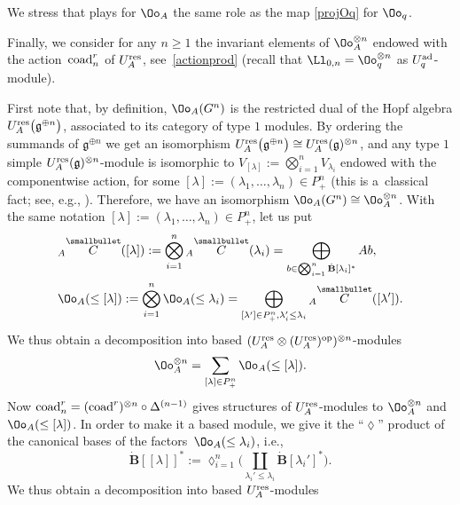 We stress that  plays for $\Oo_A$ the same role as the map \eqref{projOq} for $\Oo_q$.

Finally, we consider for any $n\geq 1$ the invariant elements of $\Oo_A^{\otimes n}$ endowed with the action~${\rm coad}^r_n$ of $U_A^{\rm res}$, see~\eqref{actionprod} \big(recall that $\Ll_{0,n}=\Oo_q^{\otimes n}$ as $U_q^{\rm ad}$-module\big).

First note that, by definition, $\Oo_A(G^n)$ is the restricted dual of the Hopf algebra $U_A^{\rm res}\big(\mathfrak{g}^{\oplus n}\big)$, associated to its category of type $1$ modules. By ordering the summands of $\mathfrak{g}^{\oplus n}$ we get an isomorphism $U_A^{\rm res}\big(\mathfrak{g}^{\oplus n}\big)\cong U_A^{\rm res}(\mathfrak{g})^{\otimes n}$, and any type $1$ simple $U_A^{\rm res}(\mathfrak{g})^{\otimes n}$-module is isomorphic to ${V_{[\lambda]} := \bigotimes_{i=1}^n V_{\lambda_i}}$ endowed with the componentwise action, for some ${[\lambda] :=(\lambda_1,\dots, \lambda_n)\in P_+^n}$ (this is a~classical fact; see, e.g., \cite[Theorem~3.10.2]{Et}). Therefore, we have an isomorphism ${\Oo_A(G^n)\cong \Oo_A^{\otimes n}}$.
With the same notation $[\lambda]:=(\lambda_1,\dots, \lambda_n)\in P_+^n$, let us put
\begin{align*}%
&{}_A \overset{\raisebox{-1.5pt}{\scriptsize$\smallbullet$}}{C} ([\lambda]) := \bigotimes_{i=1}^n {}_A \overset{\raisebox{-1.5pt}{\scriptsize$\smallbullet$}}{C} (\lambda_i) = \bigoplus_{b\in \bigotimes_{i=1}^n \dot{\mathbf{B}}[\lambda_i]^*} Ab,\\
&\Oo_A(\leq [\lambda]) := \bigotimes_{i=1}^n \Oo_A(\leq \lambda_i)=\bigoplus_{[\lambda'] \in P_+^n, \lambda_i'\leq \lambda_i} {}_A \overset{\raisebox{-1.5pt}{\scriptsize$\smallbullet$}}{C} ([\lambda']).
\end{align*}
We thus obtain a decomposition into based $(U_A^{\rm res}\otimes (U_A^{\rm res})^{\rm op})^{\otimes n}$-modules
\[%
\Oo_A^{\otimes n} = \sum_{[\lambda] \in P_+^n} \Oo_A(\leq [\lambda]).
\]
Now ${\rm coad}_n^r = ({\rm coad}^r)^{\otimes n}\circ \Delta^{(n-1)}$ gives structures of $U_A^{\rm res}$-modules to $\Oo_A^{\otimes n}$ and $\Oo_A(\leq [\lambda])$. In order to make it a based module, we give it the ``$\lozenge$'' product of the canonical bases of the factors~${\Oo_A(\leq \lambda_i)}$, i.e.,
\[\dot{\mathbf{B}} [[\lambda]]^* := \lozenge_{i=1}^n \bigg(\coprod_{\lambda_i'\leq \lambda_i}\dot{\mathbf{B}} [\lambda_i']^*\bigg).\]
We thus obtain a decomposition into based $U_A^{\rm res}$-modules
